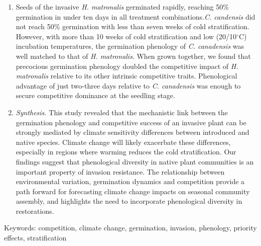 \documentclass{article}[11pt]
\begin{document}
\begin{enumerate}
\item Seeds of the invasive \textit{H. matronalis} germinated rapidly, reaching 50\% germination in under ten days in all treatment combinations.\textit{C. candensis} did not reach 50\% germination with less than seven weeks of cold stratification. However, with more than 10 weeks of cold stratification and low (20/10$^{\circ}$C) incubation temperatures, the germination phenology of \textit{C. canadensis} was well matched to that of \textit{H. matronalis}. When grown together, we found that precocious germination phenology doubled the competitive impact of \textit{H. matronalis} relative to its other intrinsic competitive traits. Phenological advantage of just two-three days relative to \textit{C. canadensis} was enough to secure competitive dominance at the seedling stage. %
\item \textit{Synthesis.} This study revealed that the mechanistic link between the germination phenology and competitive success of an invasive plant can be strongly mediated by climate sensitivity differences between introduced and native species. Climate change will likely exacerbate these differences, especially in regions where warming reduces the cold stratification. Our findings suggest that phenological diversity in native plant communities is an important property of invasion resistance. The relationship between environmental variation, germination dynamics and competition provide a path forward for forecasting climate change impacts on seasonal community assembly, and highlights the need to incorporate phenological diversity in restorations.

\end{enumerate}

Keywords: competition, climate change, germination, invasion, phenology, priority effects, stratification

\pagebreak
\end{document}

